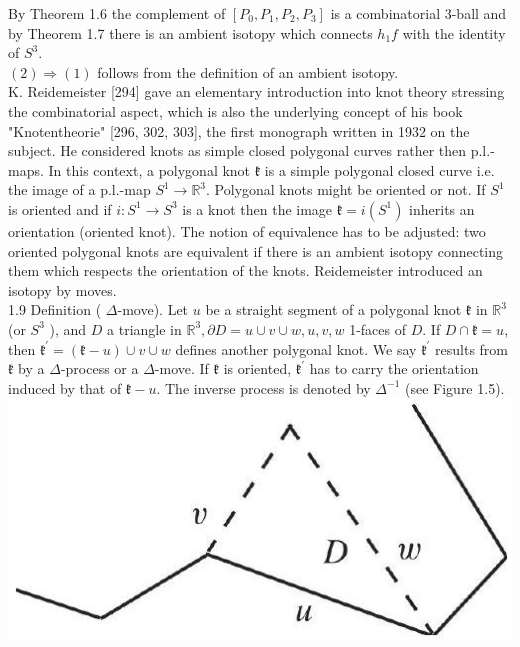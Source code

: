 \documentclass[10pt, letterpaper]{article}
\begin{document}
By Theorem 1.6 the complement of $\left[P_{0}, P_{1}, P_{2}, P_{3}\right]$ is a combinatorial 3-ball and by Theorem 1.7 there is an ambient isotopy which connects $h_{1} f$ with the identity of $S^{3}$.\\
$(2) \Longrightarrow(1)$ follows from the definition of an ambient isotopy.\\[0pt]
K. Reidemeister [294] gave an elementary introduction into knot theory stressing the combinatorial aspect, which is also the underlying concept of his book "Knotentheorie" [296, 302, 303], the first monograph written in 1932 on the subject. He considered knots as simple closed polygonal curves rather then p.l.-maps. In this context, a polygonal knot $\mathfrak{k}$ is a simple polygonal closed curve i.e. the image of a p.l.-map $S^{1} \rightarrow \mathbb{R}^{3}$. Polygonal knots might be oriented or not. If $S^{1}$ is oriented and if $i: S^{1} \rightarrow S^{3}$ is a knot then the image $\mathfrak{k}=i\left(S^{1}\right)$ inherits an orientation (oriented knot). The notion of equivalence has to be adjusted: two oriented polygonal knots are equivalent if there is an ambient isotopy connecting them which respects the orientation of the knots. Reidemeister introduced an isotopy by moves.\\
1.9 Definition ( $\Delta$-move). Let $u$ be a straight segment of a polygonal knot $\mathfrak{k}$ in $\mathbb{R}^{3}$ (or $S^{3}$ ), and $D$ a triangle in $\mathbb{R}^{3}, \partial D=u \cup v \cup w, u, v, w$ 1-faces of $D$. If $D \cap \mathfrak{k}=u$, then $\mathfrak{k}^{\prime}=(\mathfrak{k}-u) \cup v \cup w$ defines another polygonal knot. We say $\mathfrak{k}^{\prime}$ results from $\mathfrak{k}$ by a $\Delta$-process or a $\Delta$-move. If $\mathfrak{k}$ is oriented, $\mathfrak{k}^{\prime}$ has to carry the orientation induced by that of $\mathfrak{k}-u$. The inverse process is denoted by $\Delta^{-1}$ (see Figure 1.5).\\
\includegraphics[scale=0.2, center]{2025_05_21_9c06be8de7a55410f8c1g-021}
\end{document}
